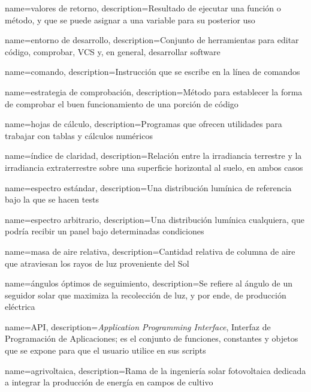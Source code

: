 {
    name={valores de retorno},
    description={Resultado de ejecutar una función o método, y que se puede asignar a una variable para su posterior uso}
}

{
    name={entorno de desarrollo},
    description={Conjunto de herramientas para editar código, comprobar, \gls{VCS} y, en general, desarrollar \gls{software}}
}

{
    name={comando},
    description={Instrucción que se escribe en la \gls{línea de comandos}}
}

{
    name={estrategia de comprobación},
    description={Método para establecer la forma de comprobar el buen funcionamiento de una porción de código}
}

{
    name={hojas de cálculo},
    description={Programas que ofrecen utilidades para trabajar con tablas y cálculos numéricos}
}

{
    name={índice de claridad},
    description={Relación entre la irradiancia terrestre y la irradiancia extraterrestre sobre una superficie horizontal al suelo, en ambos casos}
}

{
    name={espectro estándar},
    description={Una distribución lumínica de referencia bajo la que se hacen tests}
}

{
    name={espectro arbitrario},
    description={Una distribución lumínica cualquiera, que podría recibir un panel bajo determinadas condiciones}
}

{
    name={masa de aire relativa},
    description={Cantidad relativa de columna de aire que atraviesan los rayos de luz proveniente del Sol}
}

{
    name={ángulos óptimos de seguimiento},
    description={Se refiere al ángulo de un seguidor solar que maximiza la recolección de luz, y por ende, de producción eléctrica}
}

{
    name={API},
    description={\textit{Application Programming Interface}, Interfaz de Programación de Aplicaciones; es el conjunto de funciones, constantes y objetos que se expone para que el usuario utilice en sus \gls{scripts}}
}

{
    name={agrivoltaica},
    description={Rama de la ingeniería solar fotovoltaica dedicada a integrar la producción de energía en campos de cultivo}
}

